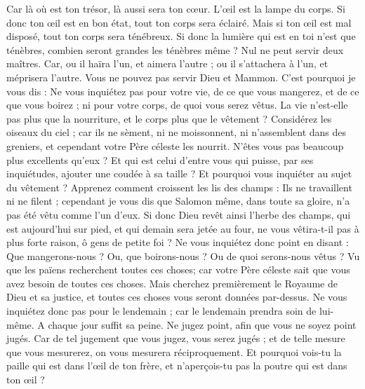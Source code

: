 \begin{multicols}{2}
Car là où est ton trésor, là aussi sera ton cœur.
L'œil est la lampe du corps. Si donc ton œil est en bon état, tout ton corps sera éclairé.
Mais si ton œil est mal disposé, tout ton corps sera ténébreux. Si donc la lumière qui est en toi n'est que ténèbres, combien seront grandes les ténèbres même ?
Nul ne peut servir deux maîtres. Car, ou il haïra l'un, et aimera l'autre ; ou il s'attachera à l'un, et méprisera l'autre. Vous ne pouvez pas servir Dieu et Mammon.
C'est pourquoi je vous dis : Ne vous inquiétez pas pour votre vie, de ce que vous mangerez, et de ce que vous boirez ; ni pour votre corps, de quoi vous serez vêtus. La vie n'est-elle pas plus que la nourriture, et le corps plus que le vêtement ?
Considérez les oiseaux du ciel ; car ils ne sèment, ni ne moissonnent, ni n'assemblent dans des greniers, et cependant votre Père céleste les nourrit. N'êtes vous pas beaucoup plus excellents qu'eux ?
Et qui est celui d'entre vous qui puisse, par ses inquiétudes, ajouter une coudée à sa taille ?
Et pourquoi vous inquiéter au sujet du vêtement ? Apprenez comment croissent les lis des champs : Ils ne travaillent ni ne filent ;
cependant je vous dis que Salomon même, dans toute sa gloire, n'a pas été vêtu comme l'un d'eux.
Si donc Dieu revêt ainsi l'herbe des champs, qui est aujourd'hui sur pied, et qui demain sera jetée au four, ne vous vêtira-t-il pas à plus forte raison, ô gens de petite foi ?
Ne vous inquiétez donc point en disant : Que mangerons-nous ? Ou, que boirons-nous ? Ou de quoi serons-nous vêtus ?
Vu que les païens recherchent toutes ces choses; car votre Père céleste sait que vous avez besoin de toutes ces choses.
Mais cherchez premièrement le Royaume de Dieu et sa justice, et toutes ces choses vous seront données par-dessus.
Ne vous inquiétez donc pas pour le lendemain ; car le lendemain prendra soin de lui-même. A chaque jour suffit sa peine.
\VerseOne{}Ne jugez point, afin que vous ne soyez point jugés.
Car de tel jugement que vous jugez, vous serez jugés ; et de telle mesure que vous mesurerez, on vous mesurera réciproquement.
Et pourquoi vois-tu la paille qui est dans l'œil de ton frère, et n'aperçois-tu pas la poutre qui est dans ton œil ?

\end{multicols}
